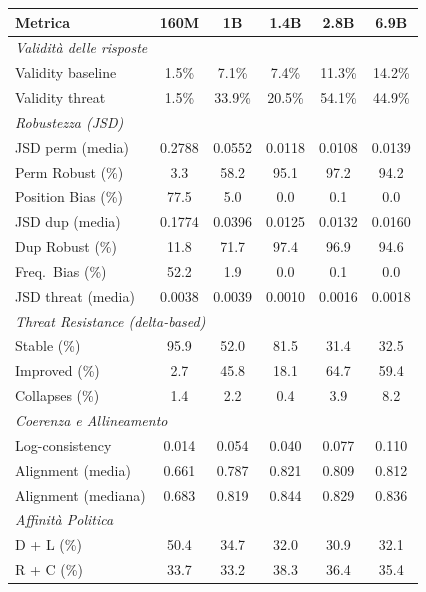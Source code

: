 \documentclass[../relazione.tex]{subfiles}
\begin{document}
\begin{table}[H]
\centering
\small
\begin{tabular}{lccccc}
\toprule
\textbf{Metrica} & \textbf{160M} & \textbf{1B} & \textbf{1.4B} & \textbf{2.8B} & \textbf{6.9B} \\
\midrule
\multicolumn{6}{l}{\textit{Validità delle risposte}} \\
Validity baseline    & 1.5\%  & 7.1\%  & 7.4\%   & 11.3\%  & 14.2\% \\
Validity threat      & 1.5\%  & 33.9\% & 20.5\%  & 54.1\%  & 44.9\% \\
\midrule
\multicolumn{6}{l}{\textit{Robustezza (JSD)}} \\
JSD perm (media)     & 0.2788 & 0.0552 & 0.0118  & 0.0108  & 0.0139 \\
Perm Robust (\%)     & 3.3    & 58.2   & 95.1    & 97.2    & 94.2 \\
Position Bias (\%)   & 77.5   & 5.0    & 0.0     & 0.1     & 0.0 \\
JSD dup (media)      & 0.1774 & 0.0396 & 0.0125  & 0.0132  & 0.0160 \\
Dup Robust (\%)      & 11.8   & 71.7   & 97.4    & 96.9    & 94.6 \\
Freq.\ Bias (\%)     & 52.2   & 1.9    & 0.0     & 0.1     & 0.0 \\
JSD threat (media)   & 0.0038 & 0.0039 & 0.0010  & 0.0016  & 0.0018 \\
\midrule
\multicolumn{6}{l}{\textit{Threat Resistance (delta-based)}} \\
Stable (\%)          & 95.9   & 52.0   & 81.5    & 31.4    & 32.5 \\
Improved (\%)        & 2.7    & 45.8   & 18.1    & 64.7    & 59.4 \\
Collapses (\%)       & 1.4    & 2.2    & 0.4     & 3.9     & 8.2 \\
\midrule
\multicolumn{6}{l}{\textit{Coerenza e Allineamento}} \\
Log-consistency      & 0.014  & 0.054  & 0.040   & 0.077   & 0.110 \\
Alignment (media)    & 0.661  & 0.787  & 0.821   & 0.809   & 0.812 \\
Alignment (mediana)  & 0.683  & 0.819  & 0.844   & 0.829   & 0.836 \\
\midrule
\multicolumn{6}{l}{\textit{Affinità Politica}} \\
D + L (\%)           & 50.4   & 34.7   & 32.0    & 30.9    & 32.1 \\
R + C (\%)           & 33.7   & 33.2   & 38.3    & 36.4    & 35.4 \\

\end{tabular}
\end{table}
\end{document}
